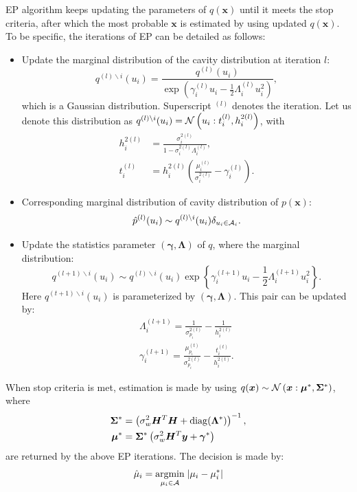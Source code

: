 \documentclass{article}
\DeclarePairedDelimiter{\diagfences}{(}{)}
\newcommand{\diag}{\operatorname{diag}\diagfences}
\begin{document}
EP algorithm keeps updating the parameters of $q(\bm{x})$ until it meets the stop criteria, after which the most probable $\bm{x}$ is estimated by using updated $q(\bm{x})$. To be specific, the iterations of EP can be detailed as follows:
\begin{itemize}
\item Update the marginal distribution of the cavity distribution at iteration $l$:
  \begin{equation}
    q^{(l)\backslash i}(u_i) = \frac{q^{(l)}(u_i)}{\exp\left( \gamma_i^{(l)}u_i - \frac{1}{2}\Lambda_i^{(l)}u_i^2 \right)} ,
  \end{equation}
  which is a Gaussian distribution. Superscript $^{(l)}$ denotes the iteration. Let us denote this distribution as $q^{(l)\backslash i}(u_i) = \mathcal{N}\left( u_i: t_i^{(l)}, h_i^{2(l)} \right)$, with
  \begin{align}
    h_i^{2 (l)} &= \frac{\sigma_i^{2 (l)}}{1-\sigma_i^{2 (l)} \Lambda_i^{(l)}}, \\
    t_i^{(l)} &= h_i^{2(l)}\left( \frac{\mu_i^{(l)}}{\sigma_i^{2(l)}} - {\gamma_i^{(l)}} \right).
  \end{align}
  

\item Corresponding marginal distribution of cavity distribution of $p(\bm{x})$:
  \begin{equation}
    \hat{p}^{(l)}(u_i) \sim q^{(l)\backslash i}(u_i)\delta_{u_i \in \mathcal{A}_i}.
  \end{equation}
\item Update the statistics parameter $\left( \bm{\gamma}, \bm{\Lambda} \right)$ of $q$, where the marginal distribution:
  \begin{equation}
    q^{(l+1)\backslash i}(u_i) \sim q^{(l)\backslash i}(u_i) \exp\left\{ \gamma_i^{(l+1)}u_i - \frac{1}{2}\Lambda_i^{(l+1)}u_i^2 \right\}.
  \end{equation}
  Here $q^{(t+1)\backslash i}(u_i)$ is parameterized by $\left(\bm{\gamma}, \bm{\Lambda}\right)$. This pair can be updated by:
  \begin{align}
    \Lambda_i^{(l+1)} = \frac{1}{\sigma_{p_i}^{2(l)}} - \frac{1}{h_i^{2(l)}} \\
    \gamma_i^{(l+1)} = \frac{\mu_{p_i}^{(t)}}{\sigma_{p_i}^{2(t)}} - \frac{t_i^{(t)}}{h_i^{2(t)}}.
  \end{align}
  
\end{itemize}

When stop criteria is met, estimation is made by using $q(\bm{x}) \sim \mathcal{N}\left(\bm{x}:\bm{\mu}^{\ast}, \bm{\Sigma}^{\ast} \right)$, where
\begin{align}
  \bm{\Sigma}^{\ast} &= \left( \sigma_{w}^2\bm{H}^{T}\bm{H} +  \diag{\bm{\Lambda}^{\ast}} \right)^{-1}, \\
  \bm{\mu}^{\ast} & = \bm{\Sigma}^{\ast}\left( \sigma_{w}^2\bm{H}^{T}\bm{y} +  \bm{\gamma}^{\ast} \right)
\end{align}
are returned by the above EP iterations. The decision is made by:
\begin{equation}
  \hat{\mu}_{i} = \underset{\mu_i \in \mathcal{A}}{\operatorname{argmin}}\; | \mu_i - \mu_i^{\ast} |
\end{equation}
\end{document}
